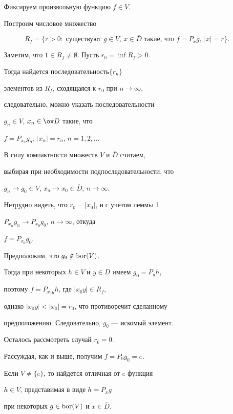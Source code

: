 \begin{pf}


Фиксируем произвольную функцию $f\in V$. 


Построим числовое множество 


$$


R_f = \{ r>0: \text{ существуют } g\in V,\ x \in \overline{D} 


\text{ такие, что } f=P_x g,\ |x|=r \}.


$$ 


Заметим, что $1 \in R_f \neq\emptyset$. Пусть $r_0 = \inf R_f > 0$. 


Тогда найдется последовательность$\{ r_n \}$ 


элементов из $R_f$, сходящаяся к $r_0$ при $n\to\infty$, 


следовательно, можно указать последовательности 


$g_n \in V$, $x_n \in \ov D$ такие, что 


$f = P_{x_n} g_n$, $|x_n| = r_n$, $n=1,2,\dotsc$ 


В силу компактности множеств $V$ и $\overline{D}$ считаем, 


выбирая при необходимости подпоследовательности, что 


$g_n \to g_0 \in V$, $x_n \to x_0 \in \overline{D}$, $n\to\infty$. 


Нетрудно видеть, что $r_0 =|x_0|$, и с учетом леммы 1\; 


$P_{x_n} g_n \to P_{x_0} g_0$, $n\to\infty$, откуда 


$f=P_{x_0} g_0$. 


Предположим, что $g_0 \notin \operatorname{bor}(V)$. 


Тогда при некоторых $h\in V$ и $y\in D$ имеем $g_0 = P_y h$, 


поэтому $f = P_{x_0 y} h$, где $|x_0 y| \in R_f$, 


однако $|x_0 y|< |x_0 |= r_0$, что противоречит сделанному 


предположению. Следовательно, $g_0$ --- искомый элемент. 





Осталось рассмотреть случай $r_0= 0$. 


Рассуждая, как и выше, получим $f = P_0 g_0 = e$. 


Если $V \neq \{ e \}$, то найдется отличная от $e$ функция 


$h \in V$, представимая в виде $h = P_x g$ 


при некоторых $g \in \operatorname{bor}(V)$ и $x \in \overline{D}$. 



\end{pf}
